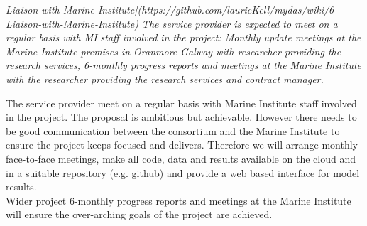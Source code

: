 
\textit{Liaison with Marine Institute](https://github.com/laurieKell/mydas/wiki/6-Liaison-with-Marine-Institute) 
The service provider is expected to meet on a regular basis with MI staff involved in the project:
Monthly update meetings at the Marine Institute premises in Oranmore Galway with researcher providing the research services, 
6-monthly progress reports and meetings at the Marine Institute with the researcher providing the research services and contract manager.}

The service provider meet on a regular basis with Marine Institute staff involved in the project. 
The proposal is ambitious but achievable. However there needs to be good communication between the consortium and the Marine Institute to ensure the project keeps focused and delivers. Therefore we will arrange monthly face-to-face meetings, make all code, data and results available on the cloud and in a suitable repository (e.g. github) and provide a web based interface for model results.\\
Wider project 6-monthly progress reports and meetings at the Marine Institute will ensure the over-arching goals of the project are achieved.
